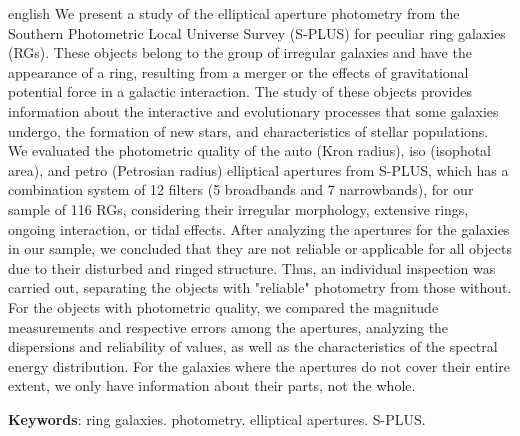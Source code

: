 \setlength{\absparsep}{18pt} %
\begin{resumo}[Abstract]
 \begin{otherlanguage*}{english}
  We present a study of the elliptical aperture photometry from the Southern Photometric Local Universe Survey (S-PLUS) for peculiar ring galaxies (RGs). These objects belong to the group of irregular galaxies and have the appearance of a ring, resulting from a merger or the effects of gravitational potential force in a galactic interaction. The study of these objects provides information about the interactive and evolutionary processes that some galaxies undergo, the formation of new stars, and characteristics of stellar populations. We evaluated the photometric quality of the auto (Kron radius), iso (isophotal area), and petro (Petrosian radius) elliptical apertures from S-PLUS, which has a combination system of 12 filters (5 broadbands and 7 narrowbands), for our sample of 116 RGs, considering their irregular morphology, extensive rings, ongoing interaction, or tidal effects. After analyzing the apertures for the galaxies in our sample, we concluded that they are not reliable or applicable for all objects due to their disturbed and ringed structure. Thus, an individual inspection was carried out, separating the objects with "reliable" photometry from those without. For the objects with photometric quality, we compared the magnitude measurements and respective errors among the apertures, analyzing the dispersions and reliability of values, as well as the characteristics of the spectral energy distribution. For the galaxies where the apertures do not cover their entire extent, we only have information about their parts, not the whole.

   \vspace{\onelineskip}
 
   \noindent 
   \textbf{Keywords}: ring galaxies. photometry. elliptical apertures. S-PLUS.
 \end{otherlanguage*}
\end{resumo}